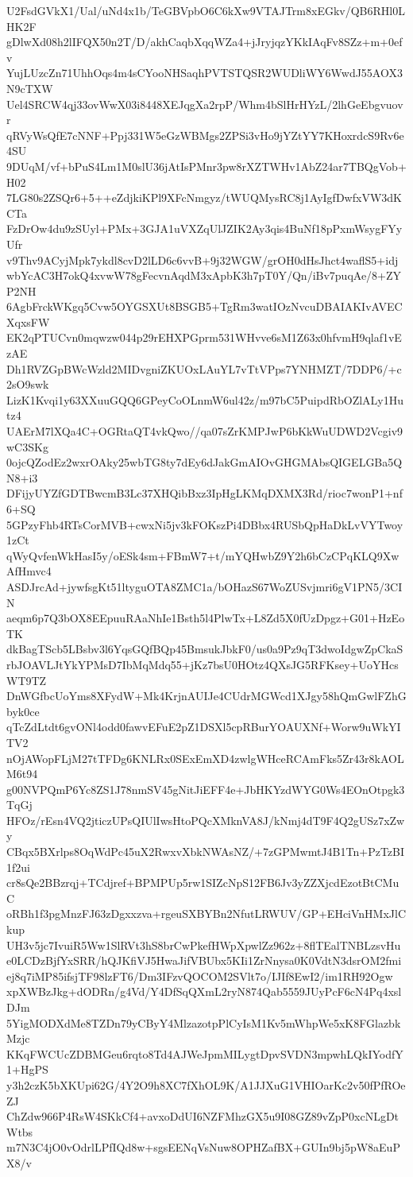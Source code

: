 U2FsdGVkX1/Ual/uNd4x1b/TeGBVpbO6C6kXw9VTAJTrm8xEGkv/QB6RHl0LHK2F
gDlwXd08h2lIFQX50n2T/D/akhCaqbXqqWZa4+jJryjqzYKkIAqFv8SZz+m+0efv
YujLUzcZn71UhhOqs4m4sCYooNHSaqhPVTSTQSR2WUDliWY6WwdJ55AOX3N9cTXW
Uel4SRCW4qj33ovWwX03i8448XEJqgXa2rpP/Whm4bSlHrHYzL/2lhGeEbgvuovr
qRVyWsQfE7cNNF+Ppj331W5eGzWBMgs2ZPSi3vHo9jYZtYY7KHoxrdcS9Rv6e4SU
9DUqM/vf+bPuS4Lm1M0slU36jAtIsPMnr3pw8rXZTWHv1AbZ24ar7TBQgVob+H02
7LG80s2ZSQr6+5++eZdjkiKPl9XFcNmgyz/tWUQMysRC8j1AyIgfDwfxVW3dKCTa
FzDrOw4du9zSUyl+PMx+3GJA1uVXZqUlJZIK2Ay3qis4BuNf18pPxmWsygFYyUfr
v9Thv9ACyjMpk7ykdl8cvD2lLD6c6vvB+9j32WGW/grOH0dHsJhct4waflS5+idj
wbYcAC3H7okQ4xvwW78gFecvnAqdM3xApbK3h7pT0Y/Qn/iBv7puqAe/8+ZYP2NH
6AgbFrckWKgq5Cvw5OYGSXUt8BSGB5+TgRm3watIOzNvcuDBAIAKIvAVECXqxsFW
EK2qPTUCvn0mqwzw044p29rEHXPGprm531WHvve6sM1Z63x0hfvmH9qlaf1vEzAE
Dh1RVZGpBWcWzld2MIDvgniZKUOxLAuYL7vTtVPps7YNHMZT/7DDP6/+c2sO9swk
LizK1Kvqi1y63XXuuGQQ6GPeyCoOLnmW6ul42z/m97bC5PuipdRbOZlALy1Hutz4
UAErM7lXQa4C+OGRtaQT4vkQwo//qa07sZrKMPJwP6bKkWuUDWD2Vcgiv9wC3SKg
0ojcQZodEz2wxrOAky25wbTG8ty7dEy6dJakGmAIOvGHGMAbsQIGELGBa5QN8+i3
DFijyUYZfGDTBwcmB3Lc37XHQibBxz3IpHgLKMqDXMX3Rd/rioc7wonP1+nf6+SQ
5GPzyFhb4RTsCorMVB+cwxNi5jv3kFOKszPi4DBbx4RUSbQpHaDkLvVYTwoy1zCt
qWyQvfenWkHasI5y/oESk4sm+FBmW7+t/mYQHwbZ9Y2h6bCzCPqKLQ9XwAfHmvc4
ASDJrcAd+jywfsgKt51ltyguOTA8ZMC1a/bOHazS67WoZUSvjmri6gV1PN5/3CIN
aeqm6p7Q3bOX8EEpuuRAaNhIe1Bsth5l4PlwTx+L8Zd5X0fUzDpgz+G01+HzEoTK
dkBagTScb5LBsbv3l6YqsGQfBQp45BmsukJbkF0/us0a9Pz9qT3dwoIdgwZpCkaS
rbJOAVLJtYkYPMsD7IbMqMdq55+jKz7bsU0HOtz4QXsJG5RFKsey+UoYHcsWT9TZ
DnWGfbcUoYms8XFydW+Mk4KrjnAUIJe4CUdrMGWcd1XJgy58hQmGwlFZhGbyk0ce
qTcZdLtdt6gvONl4odd0fawvEFuE2pZ1DSXl5cpRBurYOAUXNf+Worw9uWkYITV2
nOjAWopFLjM27tTFDg6KNLRx0SExEmXD4zwlgWHceRCAmFks5Zr43r8kAOLM6t94
g00NVPQmP6Yc8ZS1J78nmSV45gNitJiEFF4e+JbHKYzdWYG0Ws4EOnOtpgk3TqGj
HFOz/rEsn4VQ2jticzUPsQIUlIwsHtoPQcXMknVA8J/kNmj4dT9F4Q2gUSz7xZwy
CBqx5BXrlps8OqWdPc45uX2RwxvXbkNWAsNZ/+7zGPMwmtJ4B1Tn+PzTzBI1f2ui
cr8sQe2BBzrqj+TCdjref+BPMPUp5rw1SIZcNpS12FB6Jv3yZZXjcdEzotBtCMuC
oRBh1f3pgMnzFJ63zDgxxzva+rgeuSXBYBn2NfutLRWUV/GP+EHciVnHMxJlCkup
UH3v5jc7IvuiR5Ww1SlRVt3hS8brCwPkefHWpXpwlZz962z+8flTEalTNBLzsvHu
e0LCDzBjfYxSRR/hQJKfiVJ5HwaJifVBUbx5KIi1ZrNnysa0K0VdtN3dsrOM2fmi
ej8q7iMP85ifsjTF98lzFT6/Dm3IFzvQOCOM2SVlt7o/IJIf8EwI2/im1RH92Ogw
xpXWBzJkg+dODRn/g4Vd/Y4DfSqQXmL2ryN874Qab5559JUyPcF6cN4Pq4xslDJm
5YigMODXdMe8TZDn79yCByY4MlzazotpPlCyIsM1Kv5mWhpWe5xK8FGlazbkMzjc
KKqFWCUcZDBMGeu6rqto8Td4AJWeJpmMILygtDpvSVDN3mpwhLQkIYodfY1+HgPS
y3h2czK5bXKUpi62G/4Y2O9h8XC7fXhOL9K/A1JJXuG1VHIOarKc2v50fPfROeZJ
ChZdw966P4RsW4SKkCf4+avxoDdUI6NZFMhzGX5u9I08GZ89vZpP0xcNLgDtWtbs
m7N3C4jO0vOdrlLPfIQd8w+sgsEENqVsNuw8OPHZafBX+GUIn9bj5pW8aEuPX8/v
